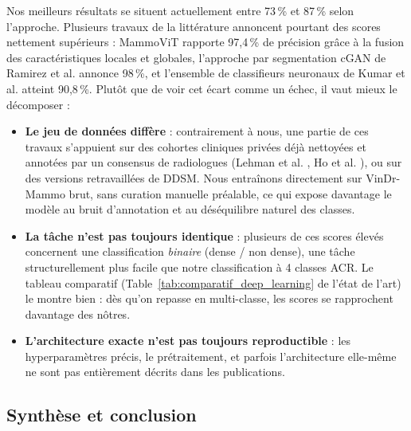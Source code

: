 \documentclass[12pt,a4paper]{report}
\begin{document}
Nos meilleurs résultats se situent actuellement entre 73\,\% et 87\,\%
selon l'approche. Plusieurs travaux de la littérature annoncent pourtant des
scores nettement supérieurs : MammoViT \cite{ref19} rapporte 97,4\,\% de
précision grâce à la fusion des caractéristiques locales et globales,
l'approche par segmentation cGAN de Ramirez et al. \cite{ref18} annonce
98\,\%, et l'ensemble de classifieurs neuronaux de Kumar et al.
\cite{ref22} atteint 90,8\,\%. Plutôt que de voir cet écart comme un échec,
il vaut mieux le décomposer :
\begin{itemize}
    \item \textbf{Le jeu de données diffère} : contrairement à nous, une
    partie de ces travaux s'appuient sur des cohortes cliniques privées déjà
    nettoyées et annotées par un consensus de radiologues (Lehman et al.
    \cite{ref13}, Ho et al. \cite{ref3}), ou sur des versions retravaillées
    de DDSM. Nous entraînons directement sur VinDr-Mammo brut, sans
    curation manuelle préalable, ce qui expose davantage le modèle au bruit
    d'annotation et au déséquilibre naturel des classes.
    \item \textbf{La tâche n'est pas toujours identique} : plusieurs de ces
    scores élevés concernent une classification \emph{binaire}
    (dense / non dense), une tâche structurellement plus facile que notre
    classification à 4 classes ACR. Le tableau comparatif
    (Table~\ref{tab:comparatif_deep_learning} de l'état de l'art) le montre
    bien : dès qu'on repasse en multi-classe, les scores se rapprochent
    davantage des nôtres.
    \item \textbf{L'architecture exacte n'est pas toujours reproductible} :
    les hyperparamètres précis, le prétraitement, et parfois l'architecture
    elle-même ne sont pas entièrement décrits dans les publications.
\end{itemize}

\subsection{Synthèse et conclusion}
\end{document}

